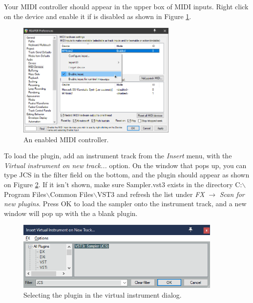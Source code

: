 \documentclass[12pt, a4paper, hidelinks]{report}
\begin{document}
	Your MIDI controller should appear in the upper box of MIDI inputs. Right click on the device and enable it if is disabled as shown in Figure \ref{fig:udevon}.
	\begin{figure}[h!]
		\centering
		\includegraphics[width=0.7\textwidth]{u/dev_on.png}
		\caption{An enabled MIDI controller.}
		\label{fig:udevon}
	\end{figure}
	
	To load the plugin, add an instrument track from the \textit{Insert} menu, with the \textit{Virtual instrument on new track...} option. On the window that pops up, you can type JCS in the filter field on the bottom, and the plugin should appear as shown on Figure \ref{fig:load}. If it isn't shown, make sure Sampler.vst3 exists in the directory C:$\backslash$Program Files$\backslash$Common Files$\backslash$VST3 and refresh the list under \textit{FX} $\rightarrow$ \textit{Scan for new plugins}. Press OK to load the sampler onto the instrument track, and a new window will pop up with the a blank plugin.
	
	\begin{figure}[h]
		\centering
		\includegraphics[width=0.9\textwidth]{u/load.png}
		\caption{Selecting the plugin in the virtual instrument dialog.}
		\label{fig:load}
	\end{figure}
	
\end{document}
